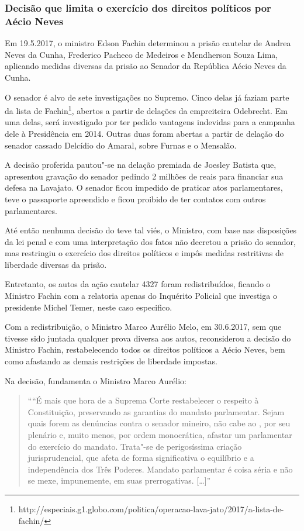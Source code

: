 \subsubsection{Decisão que limita o exercício dos direitos políticos por
Aécio Neves}

Em 19.5.2017, o ministro Edson Fachin determinou a prisão cautelar de
Andrea Neves da Cunha, Frederico Pacheco de Medeiros e Mendherson Souza
Lima, aplicando medidas diversas da prisão ao Senador da República Aécio
Neves da Cunha.

O senador é alvo de sete investigações no Supremo. Cinco delas já faziam
parte
da lista de Fachin\footnote{http://especiais.g1.globo.com/politica/operacao-lava-jato/2017/a-lista-de-fachin/}, abertos a partir de delações da empreiteira Odebrecht. Em
uma delas, será investigado por ter pedido vantagens indevidas para a
campanha dele à Presidência em 2014. Outras duas foram abertas a partir
de delação do senador cassado Delcídio do Amaral, sobre Furnas e o
Mensalão.

A decisão proferida pautou"-se na delação premiada de Joesley Batista
que, apresentou gravação do senador pedindo 2 milhões de reais para
financiar sua defesa na Lavajato. O senador ficou impedido de praticar
atos parlamentares, teve o passaporte apreendido e ficou proibido de ter
contatos com outros parlamentares.

Até então nenhuma decisão do  teve tal viés, o Ministro, com base nas
disposições da lei penal e com uma interpretação dos fatos não decretou
a prisão do senador, mas restringiu o exercício dos direitos políticos e
impôs medidas restritivas de liberdade diversas da prisão.

Entretanto, os autos da ação cautelar 4327 foram redistribuídos, ficando
o Ministro Fachin com a relatoria apenas do Inquérito Policial que
investiga o presidente Michel Temer, neste caso especifico.

Com a redistribuição, o Ministro Marco Aurélio Melo, em 30.6.2017, sem
que tivesse sido juntada qualquer prova diversa aos autos, reconsiderou
a decisão do Ministro Fachin, restabelecendo todos os direitos políticos
a Aécio Neves, bem como afastando as demais restrições de liberdade
impostas.

Na decisão, fundamenta o Ministro Marco Aurélio:

\begin{quote}
````É mais que hora de a Suprema Corte restabelecer o respeito à
Constituição, preservando as garantias do mandato parlamentar. Sejam
quais forem as denúncias contra o senador mineiro, não cabe ao , por
seu plenário e, muito menos, por ordem monocrática, afastar um
parlamentar do exercício do mandato. Trata"-se de perigosíssima criação
jurisprudencial, que afeta de forma significativa o equilíbrio e a
independência dos Três Poderes. Mandato parlamentar é coisa séria e não
se mexe, impunemente, em suas prerrogativas. {[}\ldots{}{]}''
\end{quote}

